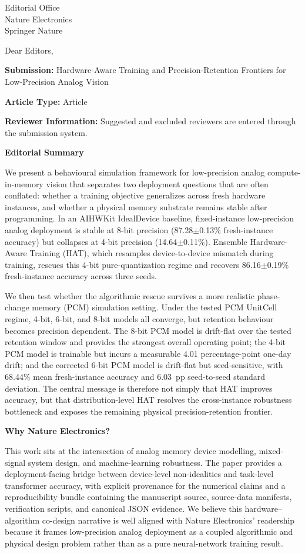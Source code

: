 \documentclass[11pt,a4paper]{letter}
\begin{document}
\begin{letter}{Editorial Office\\Nature Electronics\\Springer Nature}

\opening{Dear Editors,}

\textbf{Submission:} Hardware-Aware Training and Precision-Retention Frontiers for Low-Precision Analog Vision

\textbf{Article Type:} Article

\textbf{Reviewer Information:} Suggested and excluded reviewers are entered through the submission system.

\vspace{0.5em}
\textbf{Editorial Summary}

We present a behavioural simulation framework for low-precision analog compute-in-memory vision that separates two deployment questions that are often conflated: whether a training objective generalizes across fresh hardware instances, and whether a physical memory substrate remains stable after programming. In an AIHWKit IdealDevice baseline, fixed-instance low-precision analog deployment is stable at 8-bit precision (87.28$\pm$0.13\% fresh-instance accuracy) but collapses at 4-bit precision (14.64$\pm$0.11\%). Ensemble Hardware-Aware Training (HAT), which resamples device-to-device mismatch during training, rescues this 4-bit pure-quantization regime and recovers 86.16$\pm$0.19\% fresh-instance accuracy across three seeds.

We then test whether the algorithmic rescue survives a more realistic phase-change memory (PCM) simulation setting. Under the tested PCM UnitCell regime, 4-bit, 6-bit, and 8-bit models all converge, but retention behaviour becomes precision dependent. The 8-bit PCM model is drift-flat over the tested retention window and provides the strongest overall operating point; the 4-bit PCM model is trainable but incurs a measurable 4.01 percentage-point one-day drift; and the corrected 6-bit PCM model is drift-flat but seed-sensitive, with 68.44\% mean fresh-instance accuracy and 6.03~pp seed-to-seed standard deviation. The central message is therefore not simply that HAT improves accuracy, but that distribution-level HAT resolves the cross-instance robustness bottleneck and exposes the remaining physical precision-retention frontier.

\vspace{0.5em}
\textbf{Why Nature Electronics?}

This work sits at the intersection of analog memory device modelling, mixed-signal system design, and machine-learning robustness. The paper provides a deployment-facing bridge between device-level non-idealities and task-level transformer accuracy, with explicit provenance for the numerical claims and a reproducibility bundle containing the manuscript source, source-data manifests, verification scripts, and canonical JSON evidence. We believe this hardware--algorithm co-design narrative is well aligned with Nature Electronics' readership because it frames low-precision analog deployment as a coupled algorithmic and physical design problem rather than as a pure neural-network training result.


\end{letter}
\end{document}
